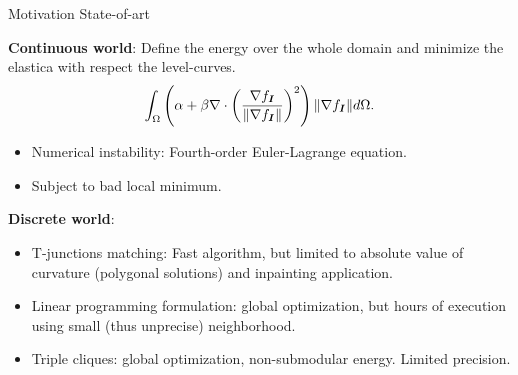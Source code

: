 \begin{frame}
{Motivation}
{State-of-art}

\textbf{Continuous world}: Define the energy over the whole domain and minimize the elastica with respect the level-curves.
%
\begin{align*}
\int_{\Omega}{ \left(\alpha + \beta \nabla \cdot \left(\frac{\nabla f_{\bm{I}}}{\lVert\nabla f_{\bm{I}} \rVert}\right) ^2 \right)\lVert\nabla f_{\bm{I}} \rVert d\Omega}.
\end{align*}
%
\pause
\begin{itemize}
\item{Numerical instability: Fourth-order Euler-Lagrange equation.}
\item{Subject to bad local minimum.}
\end{itemize}
%
\pause
\vspace{1em}
\textbf{Discrete world}:

\begin{itemize}
\item{T-junctions matching: Fast algorithm, but limited to absolute value of curvature (polygonal solutions) and inpainting application.}\pause
\item{Linear programming formulation: global optimization, but hours of execution using small (thus unprecise) neighborhood.}\pause
\item{Triple cliques: global optimization, non-submodular energy. Limited precision.}
\end{itemize}
\end{frame}

